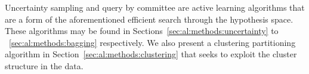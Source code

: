 \noindent Uncertainty sampling and query by committee are active learning 
algorithms that are a form of the aforementioned efficient search through the 
hypothesis space. These algorithms may be found in 
Sections~\ref{sec:al:methods:uncertainty} to ~\ref{sec:al:methods:bagging} 
respectively. We also present a clustering partitioning algorithm in 
Section~\ref{sec:al:methods:clustering} that seeks to exploit the cluster 
structure in the data.

